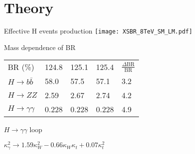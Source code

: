 \section{Theory}
\begin{frame}{Effective H events production}
  \centering
  \texttt{[image: XSBR\_8TeV\_SM\_LM.pdf]}

\end{frame}

\begin{frame}{Mass dependence of BR}
  \centering
  \begin{tabular}{lllll}
    BR (\%) & 124.8 & 125.1 & 125.4 & $\frac{\Delta \text{BR}}{\text{BR}}$\\
    $H\rightarrow b\bar{b}$ & 58.0 & 57.5 & 57.1 & 3.2\\
    $H\rightarrow ZZ$ & 2.59 & 2.67 & 2.74 & 4.2\\
    $H\rightarrow \gamma\gamma$ & 0.228 & 0.228 & 0.228 & 4.9\\
  \end{tabular}
\end{frame}
\begin{frame}{$H\rightarrow\gamma\gamma$ loop}
  \begin{center} $\kappa_\gamma^2 \rightarrow 1.59\kappa_W^2 -0.66\kappa_W\kappa_t + 0.07\kappa_t^2$\end{center}
\end{frame}
